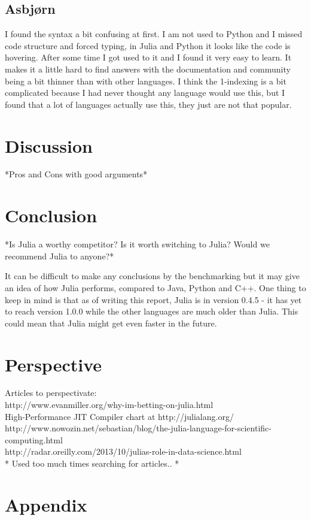 \documentclass[a4paper, 11pt, titlepage]{article}
\begin{document}
\subsection{Asbjørn}
I found the syntax a bit confusing at first. I am not used to Python and I missed code structure and forced typing, in Julia and Python it looks like the code is hovering. After some time I got used to it and I found it very easy to learn. It makes it a little hard to find answers with the documentation and community being a bit thinner than with other languages. I think the 1-indexing is a bit complicated because I had never thought any language would use this, but I found that a lot of languages actually use this, they just are not that popular.

\section{Discussion}
*Pros and Cons with good arguments*

\section{Conclusion}
*Is Julia a worthy competitor? Is it worth switching to Julia? Would we recommend Julia to anyone?*

It can be difficult to make any conclusions by the benchmarking but it may give an idea of how Julia performs, compared to Java, Python and C++. One thing to keep in mind is that as of writing this report, Julia is in version 0.4.5 - it has yet to reach version 1.0.0 while the other languages are much older than Julia. This could mean that Julia might get even faster in the future.   

\section{Perspective}
Articles to perspectivate: \\
http://www.evanmiller.org/why-im-betting-on-julia.html \\
High-Performance JIT Compiler chart at http://julialang.org/ \\
http://www.nowozin.net/sebastian/blog/the-julia-language-for-scientific-computing.html \\
http://radar.oreilly.com/2013/10/julias-role-in-data-science.html \\
* Used too much times searching for articles.. *

\newpage
\section{Appendix}
\end{document}
